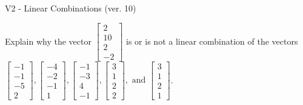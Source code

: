 \begin{exercise}
  \begin{exerciseTitle}V2 - Linear Combinations (ver. 10)\end{exerciseTitle}
  \begin{exerciseStatement}
    Explain why the vector \(\left[\begin{array}{c}
2 \\
10 \\
2 \\
-2
\end{array}\right]\)  is or is not a linear 
	combination of the vectors \(\left[\begin{array}{c}
-1 \\
-1 \\
-5 \\
2
\end{array}\right] , \left[\begin{array}{c}
-4 \\
-2 \\
-1 \\
1
\end{array}\right] , \left[\begin{array}{c}
-1 \\
-3 \\
4 \\
-1
\end{array}\right] , \left[\begin{array}{c}
3 \\
1 \\
2 \\
2
\end{array}\right] , \text{ and } \left[\begin{array}{c}
3 \\
1 \\
2 \\
1
\end{array}\right]\).
	



\end{exerciseStatement}
\end{exercise}
